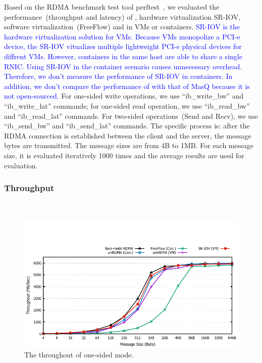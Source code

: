 Based on the RDMA benchmark test tool perftest~\cite{perftest}, we evaluated the performance~(throughput and latency) of \native, hardware virtualization SR-IOV,  software virtualization~(FreeFlow) and \sys in VMs or containers. \textcolor{blue}{SR-IOV is the hardware virtualization solution for VMs. Because VMs monopolize a PCI-e device, the SR-IOV vitualizes multiple lightweight PCI-e physical devices for diffrent VMs. However, containers in the same host are able to share a single RNIC. Using SR-IOV in the container scenario causes unnecessary overhead. Therefore, we don't measure the performance of SR-IOV in containers.} \textcolor{blue}{In addition, we don't compare the performance of \sys with that of MasQ because it is not open-sourced.} For one-sided write operations, we use ``ib\_write\_bw'' and ``ib\_write\_lat'' commands; for one-sided read operation, we use ``ib\_read\_bw'' and ``ib\_read\_lat'' commands. For two-sided operations~(Send and Recv), we use ``ib\_send\_bw'' and ``ib\_send\_lat'' commands. The specific process is: after the RDMA connection is established between the client and the server, the message bytes are transmitted. The message sizes are from 4B to 1MB. For each message size,  it is evaluated iteratively 1000 times and the average results are used for evaluation.  

\subsubsection{\textbf{Throughput}}
\
\noindent

\begin{figure}[!ht]
	\centering
	\includegraphics[width=1.0\linewidth]{images/write-bw.pdf}
	\caption{The throughout of one-sided mode.}
	\label{fig:write-bw}
\end{figure}


